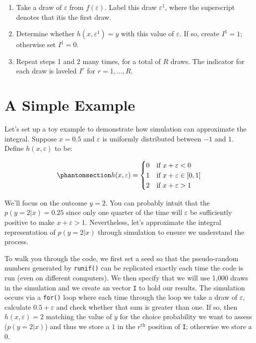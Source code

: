 \documentclass[
  letterpaper,
  DIV=11,
  numbers=noendperiod]{scrreprt}
\providecommand{\tightlist}{%
  \setlength{\itemsep}{0pt}\setlength{\parskip}{0pt}}\usepackage{longtable,booktabs,array}
\begin{document}
\begin{enumerate}
\def\labelenumi{\arabic{enumi}.}
\tightlist
\item
  Take a draw of \(\varepsilon\) from \(f(\varepsilon)\). Label this
  draw \(\varepsilon^1\), where the superscript denotes that itis the
  first draw.
\item
  Determine whether \(h(x,\varepsilon^1) = y\) with this value of
  \(\varepsilon\). If so, create \(I^1=1\); otherwise set \(I^1=0\).
\item
  Repeat steps 1 and 2 many times, for a total of \(R\) draws. The
  indicator for each draw is laveled \(I^r\) for \(r=1, \ldots, R\).
\end{enumerate}

\section{A Simple Example}\label{sec-simple_example}

Let's set up a toy example to demonstrate how simulation can approximate
the integral. Suppose \(x=0.5\) and \(\varepsilon\) is uniformly
distributed between \(-1\) and \(1\). Define \(h(x, \varepsilon)\) to
be:

\begin{equation}\phantomsection\label{eq-h_uniform}{
h(x, \varepsilon) = 
    \begin{cases}
        0  & \text{if } x + \varepsilon < 0 \\
        1  & \text{if } x + \varepsilon \in [0,1] \\
        2  & \text{if } x + \varepsilon > 1
    \end{cases}
}\end{equation}

We'll focus on the outcome \(y=2\). You can probably intuit that the
\(p(y=2 | x) = 0.25\) since only one quarter of the time will
\(\varepsilon\) be sufficiently positive to make
\(x + \varepsilon > 1\). Nevertheless, let's approximate the integral
representation of \(p(y=2|x)\) through simulation to ensure we
understand the process.

To walk you through the code, we first set a seed so that the
pseudo-random numbers generated by \texttt{runif()} can be replicated
exactly each time the code is run (even on different computers). We then
specify that we will use 1,000 draws in the simulation and we create an
vector \texttt{I} to hold our results. The simulation occurs via a
\texttt{for()} loop where each time through the loop we take a draw of
\(\varepsilon\), calculate \(0.5 + \varepsilon\) and check whether that
sum is greater than one. If so, then \(h(x,\varepsilon)=2\) matching the
value of \(y\) for the choice probability we want to assess
(\(p(y=2|x)\)) and thus we store a \(1\) in the \(r^\textrm{th}\)
position of \texttt{I}; otherwise we store a 0.
\end{document}
